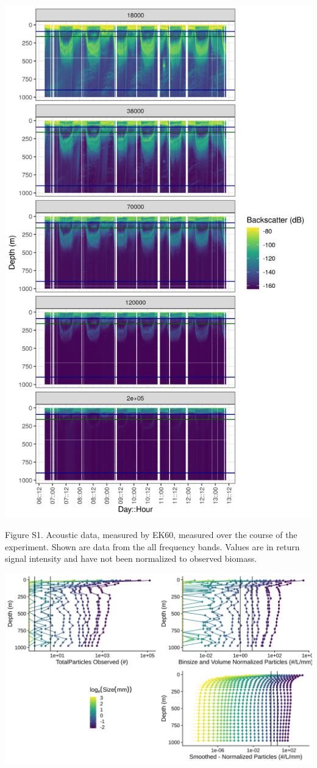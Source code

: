 \documentclass[]{article}
\begin{document}
\includegraphics{../figures/stationP2_EK60_go7.png}

Figure S1. Acoustic data, measured by EK60, measured over the course of
the experiment. Shown are data from the all frequency bands. Values are
in return signal intensity and have not been normalized to observed
biomass.

\includegraphics{../figures/AllParticleSizes.svg}
\end{document}
